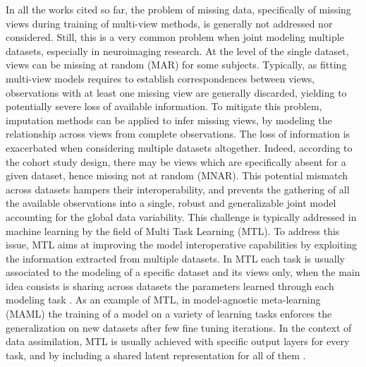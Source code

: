 % 
In all the works cited so far, the problem of missing data, specifically of missing views during training of multi-view methods, is generally not addressed nor considered.
Still, this is a very common problem when joint modeling multiple datasets, especially in neuroimaging research.
At the level of the single dataset, views can be missing at random (MAR) for some subjects.
Typically, as fitting multi-view models requires to establish correspondences between views, observations with at least one missing view are generally discarded, yielding to potentially severe loss of available information.
To mitigate this problem, imputation methods can be applied to infer missing views, by modeling the relationship across views from complete observations.
%
The loss of information is exacerbated when considering multiple datasets altogether.
Indeed, according to the cohort study design, there may be views which are specifically absent for a given dataset, hence missing not at random (MNAR).
This potential mismatch across datasets hampers their interoperability,
and prevents the gathering of all the available observations into a single, robust and generalizable joint model accounting for the global data variability.
%
This challenge is typically addressed in machine learning by the field of Multi Task Learning (MTL).
To address this issue, MTL aims at improving the model interoperative capabilities by exploiting the information extracted from multiple datasets.
In MTL each task is usually associated to the modeling of a specific dataset and its views only,
when the main idea consists is sharing across datasets the parameters learned through each modeling task \citep{Caruana1998, Dorado-Moreno2020}.
As an example of MTL, in model-agnostic meta-learning (MAML) \citep{MAML1} the training of a model on a variety of learning tasks enforces the generalization on new datasets after few fine tuning iterations.
%
In the context of data assimilation, MTL is usually achieved with specific output layers for every task, and by including a shared latent representation for all of them \citep{Dorado-Moreno2020}.
